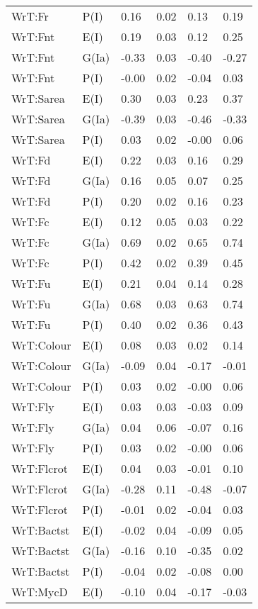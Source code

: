 \begin{center}
\begin{longtable}{|p{1.1in}|p{0.7in}|p{0.7in}|p{0.6in}|p{0.6in}|p{0.6in}|}
  WrT:Fr & P(I) & 0.16 & 0.02 & 0.13 & 0.19 \\ 
  WrT:Fnt & E(I) & 0.19 & 0.03 & 0.12 & 0.25 \\ 
  WrT:Fnt & G(Ia) & -0.33 & 0.03 & -0.40 & -0.27 \\ 
  WrT:Fnt & P(I) & -0.00 & 0.02 & -0.04 & 0.03 \\ 
  WrT:Sarea & E(I) & 0.30 & 0.03 & 0.23 & 0.37 \\ 
  WrT:Sarea & G(Ia) & -0.39 & 0.03 & -0.46 & -0.33 \\ 
  WrT:Sarea & P(I) & 0.03 & 0.02 & -0.00 & 0.06 \\ 
  WrT:Fd & E(I) & 0.22 & 0.03 & 0.16 & 0.29 \\ 
  WrT:Fd & G(Ia) & 0.16 & 0.05 & 0.07 & 0.25 \\ 
  WrT:Fd & P(I) & 0.20 & 0.02 & 0.16 & 0.23 \\ 
  WrT:Fc & E(I) & 0.12 & 0.05 & 0.03 & 0.22 \\ 
  WrT:Fc & G(Ia) & 0.69 & 0.02 & 0.65 & 0.74 \\ 
  WrT:Fc & P(I) & 0.42 & 0.02 & 0.39 & 0.45 \\ 
  WrT:Fu & E(I) & 0.21 & 0.04 & 0.14 & 0.28 \\ 
  WrT:Fu & G(Ia) & 0.68 & 0.03 & 0.63 & 0.74 \\ 
  WrT:Fu & P(I) & 0.40 & 0.02 & 0.36 & 0.43 \\ 
  WrT:Colour & E(I) & 0.08 & 0.03 & 0.02 & 0.14 \\ 
  WrT:Colour & G(Ia) & -0.09 & 0.04 & -0.17 & -0.01 \\ 
  WrT:Colour & P(I) & 0.03 & 0.02 & -0.00 & 0.06 \\ 
  WrT:Fly & E(I) & 0.03 & 0.03 & -0.03 & 0.09 \\ 
  WrT:Fly & G(Ia) & 0.04 & 0.06 & -0.07 & 0.16 \\ 
  WrT:Fly & P(I) & 0.03 & 0.02 & -0.00 & 0.06 \\ 
  WrT:Flcrot & E(I) & 0.04 & 0.03 & -0.01 & 0.10 \\ 
  WrT:Flcrot & G(Ia) & -0.28 & 0.11 & -0.48 & -0.07 \\ 
  WrT:Flcrot & P(I) & -0.01 & 0.02 & -0.04 & 0.03 \\ 
  WrT:Bactst & E(I) & -0.02 & 0.04 & -0.09 & 0.05 \\ 
  WrT:Bactst & G(Ia) & -0.16 & 0.10 & -0.35 & 0.02 \\ 
  WrT:Bactst & P(I) & -0.04 & 0.02 & -0.08 & 0.00 \\ 
  WrT:MycD & E(I) & -0.10 & 0.04 & -0.17 & -0.03 \\ 

\end{longtable}
\end{center}
